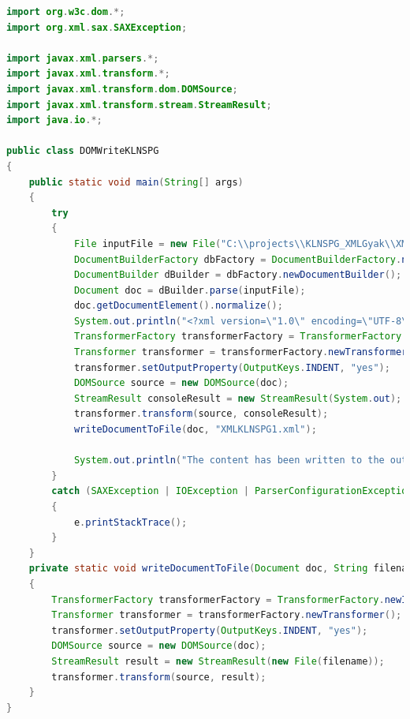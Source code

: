\documentclass[12pt]{report}
\begin{document}
\begin{lstlisting}[caption={DOMWriteKLNSPG.java} adatíró program, language=Java]
import org.w3c.dom.*;
import org.xml.sax.SAXException;

import javax.xml.parsers.*;
import javax.xml.transform.*;
import javax.xml.transform.dom.DOMSource;
import javax.xml.transform.stream.StreamResult;
import java.io.*;

public class DOMWriteKLNSPG 
{
	public static void main(String[] args) 
	{
		try 
		{
			File inputFile = new File("C:\\projects\\KLNSPG_XMLGyak\\XMLTaskKLNSPG\\XMLKLNSPG.xml");
			DocumentBuilderFactory dbFactory = DocumentBuilderFactory.newInstance();
			DocumentBuilder dBuilder = dbFactory.newDocumentBuilder();
			Document doc = dBuilder.parse(inputFile);
			doc.getDocumentElement().normalize();
			System.out.println("<?xml version=\"1.0\" encoding=\"UTF-8\"?>");
			TransformerFactory transformerFactory = TransformerFactory.newInstance();
			Transformer transformer = transformerFactory.newTransformer();
			transformer.setOutputProperty(OutputKeys.INDENT, "yes");
			DOMSource source = new DOMSource(doc);
			StreamResult consoleResult = new StreamResult(System.out);
			transformer.transform(source, consoleResult);
			writeDocumentToFile(doc, "XMLKLNSPG1.xml");
			
			System.out.println("The content has been written to the output file successfully.");
		} 
		catch (SAXException | IOException | ParserConfigurationException | TransformerException e) 
		{
			e.printStackTrace();
		}
	}
	private static void writeDocumentToFile(Document doc, String filename) throws TransformerException 
	{
		TransformerFactory transformerFactory = TransformerFactory.newInstance();
		Transformer transformer = transformerFactory.newTransformer();
		transformer.setOutputProperty(OutputKeys.INDENT, "yes");
		DOMSource source = new DOMSource(doc);
		StreamResult result = new StreamResult(new File(filename));
		transformer.transform(source, result);
	}
}
\end{lstlisting}
\end{document}
